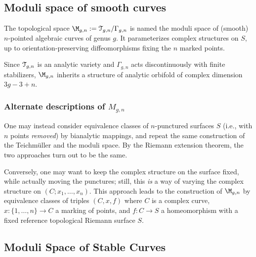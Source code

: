 \subsection{Moduli space of smooth curves}
\label{sec:Mgn}

\begin{definition}
  The topological space $\M_{g,n} := \T_{g,n} / \Gamma_{g,n}$ is named the
  moduli space of (smooth) $n$-pointed algebraic curves of genus $g$.
  It parameterizes complex structures on $S$, up to
  orientation-preserving diffeomorphisms fixing the $n$ marked points.
\end{definition}
Since $\mathcal{T}_{g,n}$ is an analytic variety and $\Gamma_{g,n}$ acts
discontinuously with finite stabilizers, $\M_{g,n}$ inherits a
structure of analytic orbifold of complex dimension $3g - 3 + n$.

\subsubsection{Alternate descriptions of $M_{g,n}$}
\label{sec:alternate-Mgn}
One may instead consider equivalence classes of $n$-punctured surfaces
$S$ (i.e., with $n$ points \emph{removed}) by bianalytic mappings, and
repeat the same construction of the Teichm\"uller and the moduli space.
By the Riemann extension theorem, the two approaches turn out to be
the same.

Conversely, one may want to keep the complex structure on the surface
fixed, while actually moving the punctures; still, this \emph{is} a
way of varying the complex structure on $(C; x_1, \dots, x_n)$. This
approach leads to the construction of $\M_{g,n}$ by equivalence
classes of triples $(C, x, f)$ where $C$ is a complex curve, $x: \{1,
\ldots, n\} \longrightarrow C$ a marking of points, and $f: C \to S$ a homeomorphism with a
fixed reference topological Riemann surface $S$.


\subsection{Moduli Space of Stable Curves}
\label{sec:moduli-space-stable}

